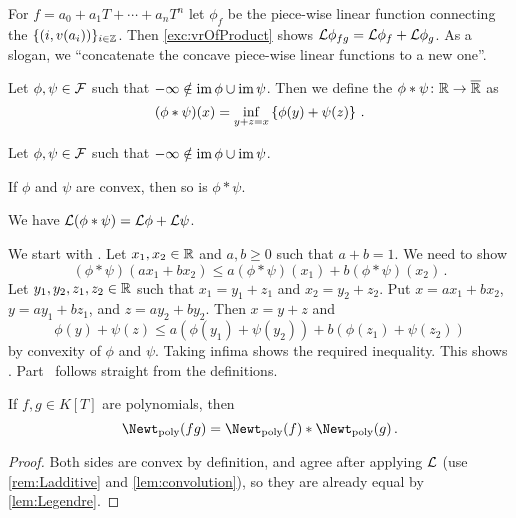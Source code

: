 \documentclass[a4paper, 10pt, oneside, DIV=9, chapterprefix=true, numbers=enddot,bibliography=totoc]{scrbook}
\begin{document}
\begin{rem}\label{rem:Ladditive}
	For $f=a_0+a_1T+\dotsb+a_nT^n$ let $\phi_f$ be the piece-wise linear function connecting the $\{(i,v(a_i))\}_{i\in\mathbb{Z}}$. Then \cref{exc:vrOfProduct} shows $\Ll\phi_{fg}=\Ll\phi_f+\Ll\phi_g$. As a slogan, we \enquote{concatenate the concave piece-wise linear functions to a new one}.
\end{rem}
\begin{defi}
	Let $\phi,\psi\in\Ff$ such that $-\infty\notin \im\phi\cup\im\psi$. Then we define the  $\phi*\psi\colon \IR\morphism\ov{\IR}$ as
	\begin{equation*}
		(\phi*\psi)(x)=\inff_{y+z=x}\left\{\phi(y)+\psi(z)\right\}\,.
	\end{equation*}
\end{defi}
\begin{lem}\label{lem:convolution}
	Let $\phi,\psi\in\Ff$ such that $-\infty\notin \im\phi\cup\im\psi$.
	\begin{numerate}
		\item If $\phi$ and $\psi$ are convex, then so is $\phi*\psi$.
		\item We have $\Ll(\phi*\psi)=\Ll\phi+\Ll\psi$.
	\end{numerate}
\end{lem}
\begin{proof*}
	We start with . Let $x_1,x_2\in\mathbb{R}$ and $a,b\geq 0$ such that $a+b=1$. We need to show
	\begin{equation*}
		(\phi*\psi)(ax_1+bx_2)\leq a(\phi*\psi)(x_1)+b(\phi*\psi)(x_2)\,.
	\end{equation*}
	Let $y_1,y_2,z_1,z_2\in\mathbb{R}$ such that $x_1=y_1+z_1$ and $x_2=y_2+z_2$. Put $x=ax_1+bx_2$, $y=ay_1+bz_1$, and $z=ay_2+by_2$. Then $x=y+z$ and 
	\begin{equation*}
		\phi(y)+\psi(z)\leq a(\phi(y_1)+\psi(y_2))+b(\phi(z_1)+\psi(z_2))
	\end{equation*}
	by convexity of $\phi$ and $\psi$. Taking infima shows the required inequality. This shows . Part~ follows straight from the definitions.
\end{proof*}
\begin{cor}\label{cor:NewtConvolution}
	If $f,g\in K[T]$ are polynomials, then
	\begin{equation*}
		\Newt_\poly(fg)=\Newt_\poly(f)*\Newt_\poly(g)\,.
	\end{equation*}
\end{cor}
\begin{proof}
	Both sides are convex by definition, and agree after applying $\mathcal{L}$ (use \cref{rem:Ladditive} and \cref{lem:convolution}), so they are already equal by \cref{lem:Legendre}.
\end{proof}
\end{document}
